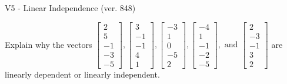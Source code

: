 \begin{exercise}
  \begin{exerciseTitle}V5 - Linear Independence (ver. 848)\end{exerciseTitle}
  \begin{exerciseStatement}
    Explain why the vectors \(\left[\begin{array}{r}
2 \\
5 \\
-1 \\
-3 \\
-5
\end{array}\right] , \left[\begin{array}{r}
3 \\
-1 \\
-1 \\
4 \\
1
\end{array}\right] , \left[\begin{array}{r}
-3 \\
1 \\
0 \\
-5 \\
2
\end{array}\right] , \left[\begin{array}{r}
-4 \\
1 \\
-1 \\
-2 \\
-5
\end{array}\right] , \text{ and } \left[\begin{array}{r}
2 \\
-3 \\
-1 \\
3 \\
2
\end{array}\right]\) are linearly dependent or linearly independent.	



\end{exerciseStatement}
\end{exercise}
